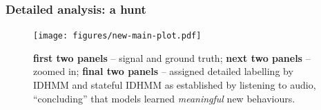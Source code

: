 \documentclass[aspectratio=169]{beamer}
\begin{document}
    \begin{frame}
        \frametitle{Detailed analysis: a hunt}
        \begin{figure}
            \texttt{[image: figures/new-main-plot.pdf]}
            \caption{{\bf first two panels} -- signal and ground truth; {\bf next two panels} -- zoomed in; {\bf final two panels} --  assigned detailed labelling by IDHMM and stateful IDHMM as established by listening to audio, ``concluding'' that models learned \emph{meaningful} new behaviours.}
        \end{figure}
    \end{frame}


    
\end{document}
